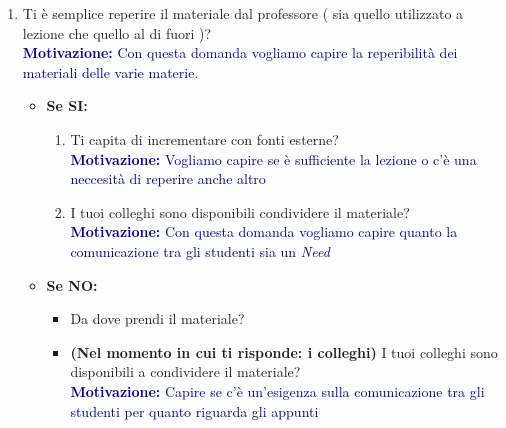\begin{enumerate}
    \item Ti è semplice reperire il materiale dal professore ( sia quello utilizzato a lezione che quello al di fuori )?\\
    \textcolor{darkblue}{\textbf{Motivazione:} Con questa domanda vogliamo capire la reperibilità dei materiali delle varie materie.}
    \begin{itemize}
        \item \textbf{Se SI:}
        \begin{enumerate}
            \item Ti capita di incrementare con fonti esterne?\\
            \textcolor{darkblue}{\textbf{Motivazione:} Vogliamo capire se è sufficiente la lezione o c'è una neccesità di reperire anche altro}
            \item I tuoi colleghi sono disponibili condividere il materiale?\\
            \textcolor{darkblue}{\textbf{Motivazione:} Con questa domanda vogliamo capire quanto la comunicazione tra gli studenti sia un \textit{Need}}
        \end{enumerate}

        \item \textbf{Se NO:}
        \begin{itemize}
            \item Da dove prendi il materiale?
            \item \textbf{(Nel momento in cui ti risponde: i colleghi)} I tuoi colleghi sono disponibili a condividere il materiale?\\
            \textcolor{darkblue}{\textbf{Motivazione:} Capire se c'è un'esigenza sulla comunicazione tra gli studenti per quanto riguarda gli appunti}
        \end{itemize}
    \end{itemize}
\end{enumerate}

